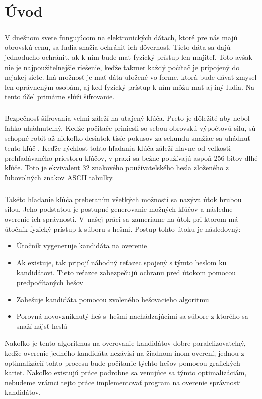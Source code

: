 \chapter*{Úvod}
\paragraph{}
V dnešnom svete fungujúcom na elektronických dátach, ktoré pre nás majú obrovskú cenu, sa ľudia snažia ochrániť ich dôvernosť. Tieto dáta sa dajú jednoducho ochrániť, ak k ním bude mať fyzický prístup len majiteľ. Toto avšak nie je najpoužiteľnejšie riešenie, keďže takmer každý počítač je pripojený do nejakej siete. Iná možnosť je mať dáta uložené vo forme, ktorá bude dávať zmysel len oprávneným osobám, aj keď fyzický prístup k ním môžu mať aj iný ľudia. Na tento účel primárne slúži šifrovanie. 

\paragraph{}
Bezpečnosť šifrovania veľmi záleží na utajený kľúča. Preto je dôležité aby nebol ľahko uhádnuteľný. Keďže počítače priniesli so sebou obrovskú výpočtovú silu, sú schopné robiť až niekoľko desiatok tisíc pokusov za sekundu snažiac sa uhádnuť tento kľúč \cite{gpu25}. Keďže rýchlosť tohto hľadania kľúča záleží hlavne od veľkosti prehľadávaného priestoru kľúčov, v praxi sa bežne používajú aspoň 256 bitov dlhé kľúče. Toto je ekvivalent 32 znakového používateľského hesla zloženého z ľubovolných znakov ASCII tabuľky.

\paragraph{}
Takéto hľadanie kľúča preberaním všetkých možností sa nazýva útok hrubou silou. Jeho podstatou je postupné generovanie možných kľúčov a následne overenie ich správnosti. V~našej práci sa zameriame na útok pri ktorom má útočník fyzický prístup k súboru s hešmi. Postup tohto útoku je následovný:
\begin{itemize}
	\item Útočník vygeneruje kandidáta na overenie
	\item Ak existuje, tak pripojí náhodný reťazec spojený s týmto heslom ku kandidátovi. Tieto reťazce zabezpečujú ochranu pred útokom pomocou predpočítaných hešov
	\item Zahešuje kandidáta pomocou zvoleného hešovacieho algoritmu
	\item Porovná novovzniknutý heš s~hešmi nachádzajúcimi sa súbore z ktorého sa snaží nájsť heslá
\end{itemize}
Nakoľko je tento algoritmus na overovanie kandidátov dobre paralelizovateľný, keďže overenie jedného kandidáta nezávisí na žiadnom inom overení, jednou z optimalizácií tohto procesu bude počítanie týchto hešov pomocou grafických kariet. Nakoľko existujú práce \cite{5665047} podrobne sa venujúce sa týmto optimalizáciám, nebudeme vrámci tejto práce implementovať program na overenie správnosti kandidátov. 

